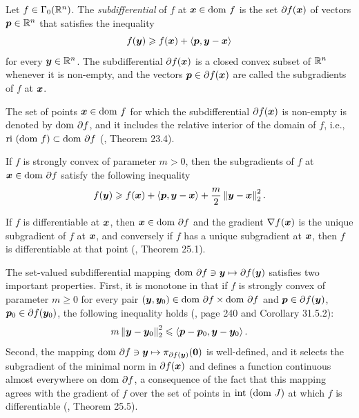\begin{defn} \label{def:subgrad} 
Let $f \in \Gamma_0(\mathbb{R}^n)$. The \textit{subdifferential} of $f$ at $\boldsymbol{x}\in\mathrm{dom~} f$ is the set $\partial f(\boldsymbol{x})$ of vectors $\boldsymbol{p}\in\mathbb{R}^n$ that satisfies the inequality
\begin{equation} \label{eq:subgrad_def}
f(\boldsymbol{y})\geqslant f(\boldsymbol{x})+\left\langle \boldsymbol{p},\boldsymbol{y}-\boldsymbol{x}\right\rangle
\end{equation}
for every $\boldsymbol{y} \in \mathbb{R}^n$. The subdifferential $\partial f(\boldsymbol{x})$ is a closed convex subset of $\mathbb{R}^n$ whenever it is non-empty, and the vectors $\boldsymbol{p}\in\partial f(\boldsymbol{x})$ are called the subgradients of $f$ at $\boldsymbol{x}$.

The set of points $\boldsymbol{x}\in\mathrm{dom~} f$ for which the subdifferential $\partial f(\boldsymbol{x})$ is non-empty is denoted by $\mathrm{dom~}\partial f$, and it includes the relative interior of the domain of $f$, i.e., $\mathrm{ri~}(\mathrm{dom~} f) \subset \mathrm{dom~}\partial f$ (\citep{rockafellar1970convex}, Theorem 23.4). 

If $f$ is strongly convex of parameter $m > 0$, then the subgradients of $f$ at $\boldsymbol{x} \in \mathrm{dom~} \partial f$ satisfy the following inequality
\[
f(\boldsymbol{y})\geqslant f(\boldsymbol{x})+\left\langle \boldsymbol{p},\boldsymbol{y}-\boldsymbol{x}\right\rangle + \frac{m}{2}\left\Vert{\boldsymbol{y}-\boldsymbol{x}} \right\Vert_{2}^{2}.
\]

If $f$ is differentiable at $\boldsymbol{x}$, then $\boldsymbol{x} \in \mathrm{dom~}\partial f$ and the gradient $\nabla f(\boldsymbol{x})$ is the unique subgradient of $f$ at $\boldsymbol{x}$, and conversely if $f$ has a unique subgradient at $\boldsymbol{x}$, then $f$ is differentiable at that point (\citep{rockafellar1970convex}, Theorem 25.1).

The set-valued subdifferential mapping $\mathrm{dom~} \partial f \ni \boldsymbol{y} \mapsto \partial f(\boldsymbol{y})$ satisfies two important properties. First, it is monotone in that if $f$ is strongly convex of parameter $m \geqslant 0$ for every pair $(\boldsymbol{y},\boldsymbol{y}_{0}) \in \mathrm{dom~}\partial f \times \mathrm{dom~}\partial f$ and $\boldsymbol{p}\in\partial f(\boldsymbol{y})$, $\boldsymbol{p}_{0}\in\partial f(\boldsymbol{y}_{0})$, the following inequality holds (\cite{rockafellar1970convex}, page 240 and Corollary 31.5.2):
\begin{equation} \label{eq:monotone_mapping}
m\left\Vert{\boldsymbol{y}-\boldsymbol{y}_0} \right\Vert_{2}^{2} \leqslant \left\langle \boldsymbol{p}-\boldsymbol{p}_{0},\boldsymbol{y}-\boldsymbol{y}_{0}\right\rangle.
\end{equation}
Second, the mapping $\mathrm{dom~}\partial f \ni \boldsymbol{y} \mapsto \pi_{\partial f(\boldsymbol{y})}(\boldsymbol{0})$ is well-defined, and it selects the subgradient of the minimal norm in $\partial f(\boldsymbol{x})$ and defines a function continuous almost everywhere on $\mathrm{dom~}\partial f$, a consequence of the fact that this mapping agrees with the gradient of $f$ over the set of points in $\mathrm{int~}(\mathrm{dom~} J)$ at which $f$ is differentiable (\cite{rockafellar1970convex}, Theorem 25.5). 
\end{defn}
